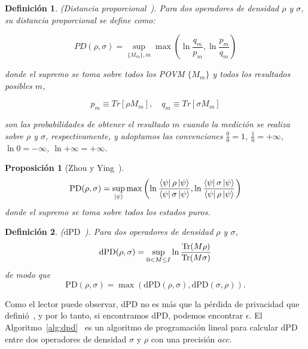 \documentclass{ieeeaccess}
\newtheorem{definition}{Definición}[section]
\newtheorem{proposition}{Proposición}[section]
\begin{document}
\begin{definition}
    (Distancia proporcional~\cite{zhou2017differential}). Para dos operadores de densidad $\rho$ y $\sigma$, su distancia proporcional se define como:

    \[
      PD(\rho, \sigma) = \sup_{\{M_m\}, m} \max\left(\ln\frac{q_m}{p_m}, \ln\frac{p_m}{q_m}\right)
    \]

    donde el supremo se toma sobre todos los POVM $\{M_m\}$ y todos los resultados posibles $m$,

    \[
      p_m \equiv Tr[\rho M_m], \quad q_m \equiv Tr[\sigma M_m]
    \]

    son las probabilidades de obtener el resultado $m$ cuando la medición se realiza sobre $\rho$ y $\sigma$, respectivamente, y adoptamos las convenciones $\frac{0}{0} = 1$, $\frac{1}{0} = +\infty$, $\ln 0 = -\infty$, $\ln{+\infty} = +\infty$.
    \label{def:proportional_distance}
\end{definition}

\begin{proposition}[Zhou y Ying~\cite{zhou2017differential}]
    \[
      \mathrm{PD}(\rho, \sigma) = \sup_{\ket{\psi}} \max\left(\ln\frac{\bra{\psi}\rho\ket{\psi}}{\bra{\psi}\sigma\ket{\psi}}, \ln\frac{\bra{\psi}\sigma\ket{\psi}}{\bra{\psi}\rho\ket{\psi}}\right)
    \]
    donde el supremo se toma sobre todos los estados puros.
    \label{prop:pd_pure_states}
\end{proposition}

\begin{definition}
    ($\mathrm{dPD}$~\cite{zhou2017differential}). Para dos operadores de densidad $\rho$ y $\sigma$,
    \[
      \mathrm{dPD}(\rho, \sigma) = \sup_{0 < M \leq I} \ln\frac{\Tr(M\rho)}{\Tr(M\sigma)}
    \]
    de modo que
    \begin{equation}
      \mathrm{PD}(\rho, \sigma) = \max\left(\mathrm{dPD}(\rho, \sigma), \mathrm{dPD}(\sigma, \rho)\right).
      \label{eq:pd_dpd}
    \end{equation}
    \label{def:dpd}
\end{definition}

Como el lector puede observar, dPD no es más que la pérdida de privacidad que definió~\cite{dwork2014algorithmic}, y por lo tanto, si encontramos dPD, podemos encontrar $\epsilon$. El Algoritmo~\ref{alg:dpd}~\cite{zhou2017differential} es un algoritmo de programación lineal para calcular dPD entre dos operadores de densidad $\sigma$ y $\rho$ con una precisión $\mathit{acc}$.
\end{document}
